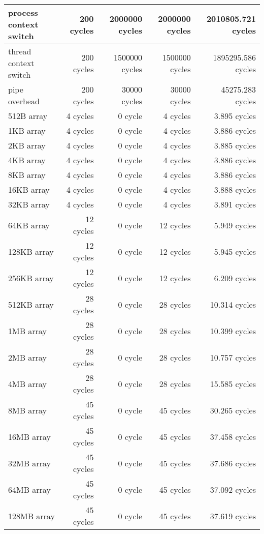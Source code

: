 \begin{table}[h]
\begin{center}
\begin{tabular}{| l | r | r | r | r |}
process context switch 	& 200 cycles		&	2000000 cycles	&2000000 cycles	& 2010805.721 cycles \\
\hline
thread context switch 	& 200 cycles		&	1500000 cycles	&1500000 cycles	& 1895295.586 cycles \\ 
\hline
pipe overhead			& 200 cycles		&	30000 cycles	&30000 cycles	& 45275.283 cycles \\ 
\hline\hline

512B array	&	4 cycles	&	0 cycle		&	4 cycles	&3.895 cycles	\\ \hline
1KB array	&	4 cycles	&	0 cycle		&	4 cycles	&3.886 cycles		\\ \hline
2KB array	&	4 cycles	&	0 cycle		&	4 cycles	&3.885 cycles		\\ \hline
4KB array	&	4 cycles	&	0 cycle		&	4 cycles	&3.886 cycles		\\ \hline
8KB array	&	4 cycles	&	0 cycle		&	4 cycles	&3.886 cycles		\\ \hline
16KB	array	&	4 cycles	&	0 cycle		&	4 cycles	&3.888 cycles		\\ \hline
32KB array	&	4 cycles	&	0 cycle		&	4 cycles	&3.891 cycles		\\ \hline
64KB 	array	&	12 cycles	&	0 cycle		&	12 cycles	&5.949 cycles		\\ \hline
128KB array	&	12 cycles	&	0 cycle		&	12 cycles	&5.945 cycles		\\ \hline
256KB array	&	12 cycles	&	0 cycle		&	12 cycles	&6.209 cycles		\\ \hline
512KB array	&	28 cycles	&	0 cycle		&	28 cycles	&10.314 cycles		\\ \hline
1MB array	&	28 cycles	&	0 cycle		&	28 cycles	&10.399 cycles		\\ \hline
2MB array	&	28 cycles	&	0 cycle		&	28 cycles	&10.757 cycles		\\ \hline
4MB array	&	28 cycles	&	0 cycle		&	28 cycles	&15.585 cycles		\\ \hline
8MB array	&	45 cycles	&	0 cycle		&	45 cycles	&30.265 cycles		\\ \hline
16MB array	&	45 cycles	&	0 cycle		&	45 cycles	&37.458 cycles		\\ \hline
32MB array	&	45 cycles	&	0 cycle		&	45 cycles	&37.686 cycles		\\ \hline
64MB array	&	45 cycles	&	0 cycle		&	45 cycles	&37.092 cycles		\\ \hline
128MB array&	45 cycles	&	0 cycle		&	45 cycles	&37.619 cycles		\\ \hline \hline






\end{tabular}
\end{center}
\end{table}
